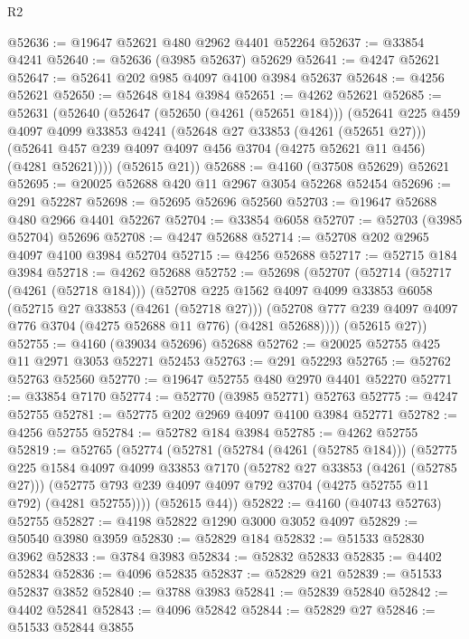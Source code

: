 \begin{lexlean}{R2}
\begin{coremodule}
@52636 := @19647 @52621 @480 @2962 @4401 @52264
@52637 := @33854 @4241
@52640 := @52636 (@3985 @52637) @52629
@52641 := @4247 @52621
@52647 := @52641 @202 @985 @4097 @4100 @3984 @52637
@52648 := @4256 @52621
@52650 := @52648 @184 @3984
@52651 := @4262 @52621
@52685 := @52631
    (@52640
      (@52647
        (@52650 (@4261 (@52651 @184)))
        (@52641
          @225
          @459
          @4097
          @4099
          @33853
          @4241
          (@52648 @27 @33853 (@4261 (@52651 @27)))
          (@52641 @457 @239 @4097 @4097 @456 @3704 (@4275 @52621 @11 @456) (@4281 @52621))))
      (@52615 @21))
@52688 := @4160 (@37508 @52629) @52621
@52695 := @20025 @52688 @420 @11 @2967 @3054 @52268 @52454
@52696 := @291 @52287
@52698 := @52695 @52696 @52560
@52703 := @19647 @52688 @480 @2966 @4401 @52267
@52704 := @33854 @6058
@52707 := @52703 (@3985 @52704) @52696
@52708 := @4247 @52688
@52714 := @52708 @202 @2965 @4097 @4100 @3984 @52704
@52715 := @4256 @52688
@52717 := @52715 @184 @3984
@52718 := @4262 @52688
@52752 := @52698
    (@52707
      (@52714
        (@52717 (@4261 (@52718 @184)))
        (@52708
          @225
          @1562
          @4097
          @4099
          @33853
          @6058
          (@52715 @27 @33853 (@4261 (@52718 @27)))
          (@52708 @777 @239 @4097 @4097 @776 @3704 (@4275 @52688 @11 @776) (@4281 @52688))))
      (@52615 @27))
@52755 := @4160 (@39034 @52696) @52688
@52762 := @20025 @52755 @425 @11 @2971 @3053 @52271 @52453
@52763 := @291 @52293
@52765 := @52762 @52763 @52560
@52770 := @19647 @52755 @480 @2970 @4401 @52270
@52771 := @33854 @7170
@52774 := @52770 (@3985 @52771) @52763
@52775 := @4247 @52755
@52781 := @52775 @202 @2969 @4097 @4100 @3984 @52771
@52782 := @4256 @52755
@52784 := @52782 @184 @3984
@52785 := @4262 @52755
@52819 := @52765
    (@52774
      (@52781
        (@52784 (@4261 (@52785 @184)))
        (@52775
          @225
          @1584
          @4097
          @4099
          @33853
          @7170
          (@52782 @27 @33853 (@4261 (@52785 @27)))
          (@52775 @793 @239 @4097 @4097 @792 @3704 (@4275 @52755 @11 @792) (@4281 @52755))))
      (@52615 @44))
@52822 := @4160 (@40743 @52763) @52755
@52827 := @4198 @52822 @1290 @3000 @3052 @4097
@52829 := @50540 @3980 @3959
@52830 := @52829 @184
@52832 := @51533 @52830 @3962
@52833 := @3784 @3983
@52834 := @52832 @52833
@52835 := @4402 @52834
@52836 := @4096 @52835
@52837 := @52829 @21
@52839 := @51533 @52837 @3852
@52840 := @3788 @3983
@52841 := @52839 @52840
@52842 := @4402 @52841
@52843 := @4096 @52842
@52844 := @52829 @27
@52846 := @51533 @52844 @3855

\end{coremodule}
\end{lexlean}
